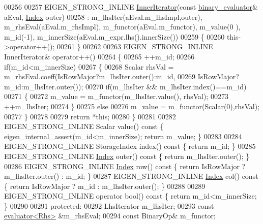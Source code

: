\begin{DoxyCode}
00256 
00257     EIGEN\_STRONG\_INLINE \hyperlink{class_eigen_1_1_inner_iterator}{InnerIterator}(\textcolor{keyword}{const} \hyperlink{struct_eigen_1_1internal_1_1binary__evaluator}{binary\_evaluator}& aEval, 
      \hyperlink{namespace_eigen_a62e77e0933482dafde8fe197d9a2cfde}{Index} outer)
00258       : m\_lhsIter(aEval.m\_lhsImpl,outer), m\_rhsEval(aEval.m\_rhsImpl), m\_functor(aEval.m\_functor), m\_value(0
      ), m\_id(-1), m\_innerSize(aEval.m\_expr.lhs().innerSize())
00259     \{
00260       this->operator++();
00261     \}
00262 
00263     EIGEN\_STRONG\_INLINE InnerIterator& operator++()
00264     \{
00265       ++m\_id;
00266       \textcolor{keywordflow}{if}(m\_id<m\_innerSize)
00267       \{
00268         Scalar rhsVal = m\_rhsEval.coeff(IsRowMajor?m\_lhsIter.outer():m\_id,
00269                                         IsRowMajor?m\_id:m\_lhsIter.outer());
00270         \textcolor{keywordflow}{if}(m\_lhsIter && m\_lhsIter.index()==m\_id)
00271         \{
00272           m\_value = m\_functor(m\_lhsIter.value(), rhsVal);
00273           ++m\_lhsIter;
00274         \}
00275         \textcolor{keywordflow}{else}
00276           m\_value = m\_functor(Scalar(0),rhsVal);
00277       \}
00278 
00279       \textcolor{keywordflow}{return} *\textcolor{keyword}{this};
00280     \}
00281 
00282     EIGEN\_STRONG\_INLINE Scalar value()\textcolor{keyword}{ const }\{ eigen\_internal\_assert(m\_id<m\_innerSize); \textcolor{keywordflow}{return} m\_value; \}
00283 
00284     EIGEN\_STRONG\_INLINE StorageIndex index()\textcolor{keyword}{ const }\{ \textcolor{keywordflow}{return} m\_id; \}
00285     EIGEN\_STRONG\_INLINE \hyperlink{namespace_eigen_a62e77e0933482dafde8fe197d9a2cfde}{Index} outer()\textcolor{keyword}{ const }\{ \textcolor{keywordflow}{return} m\_lhsIter.outer(); \}
00286     EIGEN\_STRONG\_INLINE \hyperlink{namespace_eigen_a62e77e0933482dafde8fe197d9a2cfde}{Index} row()\textcolor{keyword}{ const }\{ \textcolor{keywordflow}{return} IsRowMajor ? m\_lhsIter.outer() : m\_id; \}
00287     EIGEN\_STRONG\_INLINE \hyperlink{namespace_eigen_a62e77e0933482dafde8fe197d9a2cfde}{Index} col()\textcolor{keyword}{ const }\{ \textcolor{keywordflow}{return} IsRowMajor ? m\_id : m\_lhsIter.outer(); \}
00288 
00289     EIGEN\_STRONG\_INLINE \textcolor{keyword}{operator} bool()\textcolor{keyword}{ const }\{ \textcolor{keywordflow}{return} m\_id<m\_innerSize; \}
00290 
00291   \textcolor{keyword}{protected}:
00292     LhsIterator m\_lhsIter;
00293     \textcolor{keyword}{const} \hyperlink{struct_eigen_1_1internal_1_1evaluator}{evaluator<Rhs>} &m\_rhsEval;
00294     \textcolor{keyword}{const} BinaryOp& m\_functor;

\end{DoxyCode}
